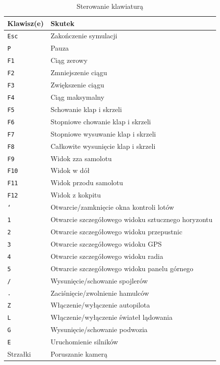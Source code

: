 \documentclass{mwrep}
\begin{document}
\begin{center}
\begin{table}[ht]
\begin{center}
\begin{tabularx}{1\textwidth}{|l|X|}
\hline
Klawisz(e) & Skutek \\ \hline
\texttt{Esc} & Zakończenie symulacji \\
\texttt{P} & Pauza \\
\texttt{F1} & Ciąg zerowy \\
\texttt{F2} & Zmniejszenie ciągu \\
\texttt{F3} & Zwiększenie ciągu \\
\texttt{F4} & Ciąg maksymalny \\
\texttt{F5} & Schowanie klap i skrzeli \\
\texttt{F6} & Stopniowe chowanie klap i skrzeli \\
\texttt{F7} & Stopniowe wysuwanie klap i skrzeli \\
\texttt{F8} & Całkowite wysunięcie klap i skrzeli \\
\texttt{F9} & Widok zza samolotu \\
\texttt{F10} & Widok w dół \\
\texttt{F11} & Widok przodu samolotu \\
\texttt{F12} & Widok z kokpitu \\
\texttt{`} & Otwarcie/zamknięcie okna kontroli lotów \\
\texttt{1} & Otwarcie szczegółowego widoku sztucznego horyzontu \\
\texttt{2} & Otwarcie szczegółowego widoku przepustnic \\
\texttt{3} & Otwarcie szczegółowego widoku GPS \\
\texttt{4} & Otwarcie szczegółowego widoku radia \\
\texttt{5} & Otwarcie szczegółowego widoku panelu górnego \\
\texttt{/} & Wysunięcie/schowanie spojlerów \\
\texttt{.} & Zaciśnięcie/zwolnienie hamulców \\
\texttt{Z} & Włączenie/wyłączenie autopilota \\
\texttt{L} & Włączenie/wyłączenie świateł lądowania \\
\texttt{G} & Wysunięcie/schowanie podwozia \\
\texttt{E} & Uruchomienie silników \\
Strzałki & Poruszanie kamerą \\
\hline
\end{tabularx}
\end{center}
\vspace{3ex}
\caption{Sterowanie klawiaturą}\label{T:Sterowanie_klawiatura}
\end{table}
\end{center}
\end{document}
